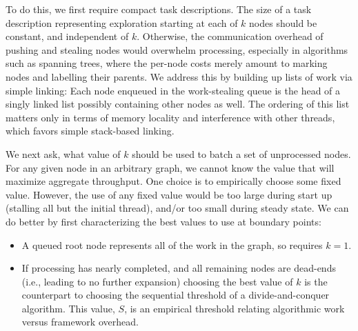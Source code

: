 To do this, we first require compact task descriptions.  The size of a
task description representing exploration starting at each of $k$ nodes
should be constant, and independent of $k$. Otherwise, the communication
overhead of pushing and stealing nodes would overwhelm processing,
especially in algorithms such as spanning trees, where the per-node
costs merely amount to marking nodes and labelling their parents.  We
address this by building up lists of work via simple linking: Each
node enqueued in the work-stealing queue is the head of a singly
linked list possibly containing other nodes as well. The ordering of
this list matters only in terms of memory locality and interference
with other threads, which favors simple stack-based linking.

We next ask, what value of $k$ should be used to batch a set of
unprocessed nodes. For any given node in an arbitrary graph, we cannot
know the value that will maximize aggregate throughput.
One choice is to empirically choose some fixed value. However,
the use of any fixed value would be too large during start up
(stalling all but the initial thread), and/or too small during
steady state. We can do better by first characterizing the
best values to use at boundary points:
\begin{itemize}
  \item A queued root node represents all of the work in the graph, so
    requires $k=1$.
  \item If processing has nearly completed, and all remaining nodes are
    dead-ends (i.e., leading to no further expansion) choosing the
    best value of $k$ is the counterpart to choosing the sequential
    threshold of a divide-and-conquer algorithm.  This value, $S$, is an
    empirical threshold relating algorithmic work versus framework
    overhead.  
\end{itemize}

